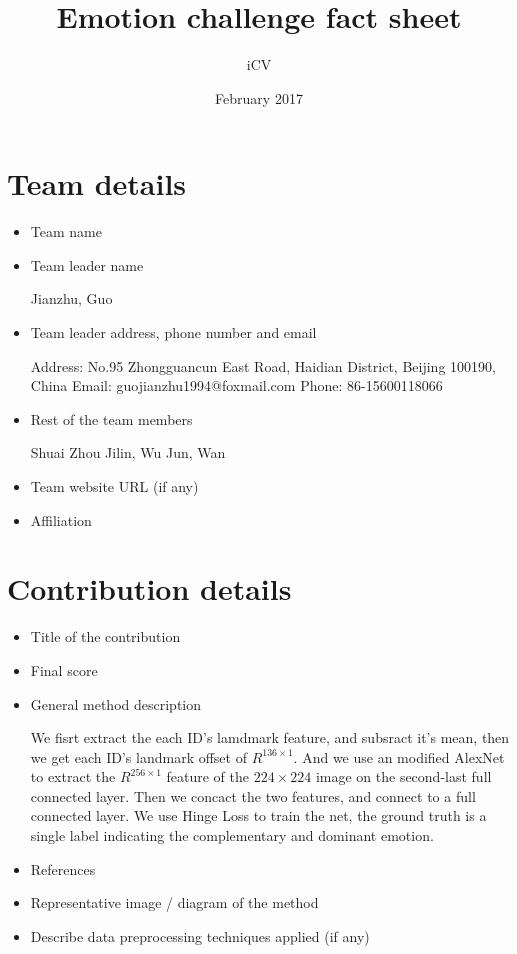 \documentclass{article}
\title{Emotion challenge fact sheet}
\author{iCV}
\date{February 2017}
\begin{document}
\maketitle

\section{Team details}

\begin{itemize}
\item Team name 
                              
\item Team leader name                           

Jianzhu, Guo
\item Team leader address, phone number and email 

Address: No.95 Zhongguancun East Road, Haidian District, Beijing 100190, China
Email: guojianzhu1994@foxmail.com
Phone: 86-15600118066
\item Rest of the team members      

Shuai Zhou
Jilin, Wu
Jun, Wan
\item Team website URL (if any)                   
\item Affiliation
\end{itemize}

\section{Contribution details}

\begin{itemize}
\item Title of the contribution                                  
\item Final score                                               
\item General method description     

We fisrt extract the each ID's lamdmark feature, and subsract it's mean, then we get each ID's landmark offset of $R^{136\times1}$. And we use an modified AlexNet to extract the $R^{256\times1}$ feature of the $224\times224$ image on the second-last full connected layer. Then we concact the two features, and connect to a full connected layer. We use Hinge Loss to train the net, the ground truth is a single label indicating the complementary and dominant emotion.
\item References                                               
\item Representative image / diagram of the method             
\item Describe data preprocessing techniques applied (if any)   
\end{itemize}
\end{document}
